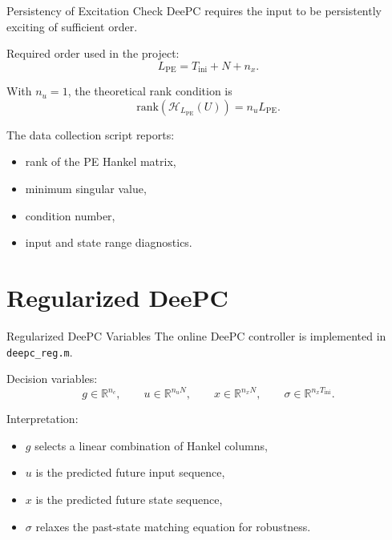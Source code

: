 \documentclass[aspectratio=169,11pt]{beamer}
\newcommand{\R}{\mathbb{R}}
\newcommand{\Tini}{T_{\mathrm{ini}}}
\newcommand{\Npred}{N}
\begin{document}
\begin{frame}{Persistency of Excitation Check}
    DeePC requires the input to be persistently exciting of sufficient order.

    \vspace{0.3cm}
    Required order used in the project:
    \[
    L_{\mathrm{PE}} = \Tini+\Npred+n_x.
    \]

    \vspace{0.3cm}
    With $n_u=1$, the theoretical rank condition is
    \[
    \mathrm{rank}\left(\mathcal{H}_{L_{\mathrm{PE}}}(U)\right)
    =
    n_u L_{\mathrm{PE}}.
    \]

    \vspace{0.3cm}
    The data collection script reports:
    \begin{itemize}
        \item rank of the PE Hankel matrix,
        \item minimum singular value,
        \item condition number,
        \item input and state range diagnostics.
    \end{itemize}
\end{frame}

\section{Regularized DeePC}

\begin{frame}{Regularized DeePC Variables}
    The online DeePC controller is implemented in \texttt{deepc\_reg.m}.

    \vspace{0.3cm}
    Decision variables:
    \[
    g \in \R^{n_c},\qquad
    u \in \R^{n_uN},\qquad
    x \in \R^{n_xN},\qquad
    \sigma \in \R^{n_x\Tini}.
    \]

    \vspace{0.3cm}
    Interpretation:
    \begin{itemize}
        \item $g$ selects a linear combination of Hankel columns,
        \item $u$ is the predicted future input sequence,
        \item $x$ is the predicted future state sequence,
        \item $\sigma$ relaxes the past-state matching equation for robustness.
    \end{itemize}
\end{frame}
\end{document}
